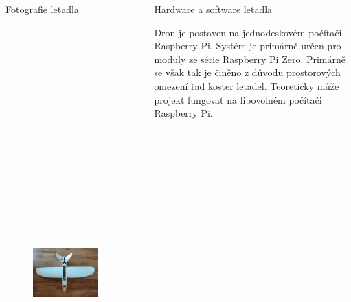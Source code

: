 \documentclass[final]{beamer}
\newlength{\sepwidth}
\newlength{\colwidth}
\newcommand{\separatorcolumn}{\begin{column}{\sepwidth}\end{column}}
\begin{document}
\begin{frame}[t]
\begin{columns}[t]
\begin{column}{\colwidth}
\begin{block}{Fotografie letadla}
				\begin{figure}[h]
					\centering
					\includegraphics[height=19cm]{../img/whole_plane.jpg}
				\end{figure}

      \end{block}

    \end{column}

    \separatorcolumn

    \begin{column}{\colwidth}

      \begin{block}{Hardware a software letadla}

				Dron je postaven na jednodeskovém počítači Raspberry Pi.
				Systém je primárně určen pro moduly ze série Raspberry Pi Zero.
				Primárně se však tak je činěno z důvodu prostorových omezení řad koster letadel.
				Teoreticky může projekt fungovat na libovolném počítači Raspberry Pi.


\end{block}
\end{column}
\end{columns}
\end{frame}
\end{document}
